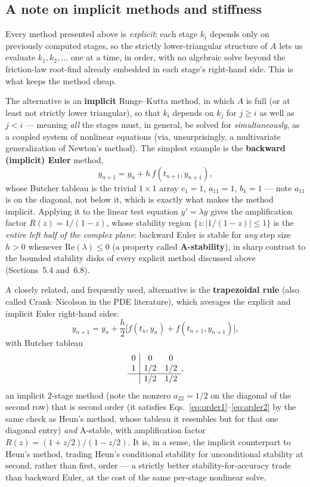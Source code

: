 \subsection{A note on implicit methods and stiffness}

Every method presented above is \emph{explicit}: each stage $k_i$ depends only on previously computed stages, so the strictly lower-triangular structure of $A$ lets us evaluate $k_1, k_2, \dots$ one at a time, in order, with no algebraic solve beyond the friction-law root-find already embedded in each stage's right-hand side. This is what keeps the method cheap.

The alternative is an \textbf{implicit} Runge--Kutta method, in which $A$ is full (or at least not strictly lower triangular), so that $k_i$ depends on $k_j$ for $j \ge i$ as well as $j<i$ --- meaning \emph{all} the stages must, in general, be solved for \emph{simultaneously}, as a coupled system of nonlinear equations (via, unsurprisingly, a multivariate generalization of Newton's method). The simplest example is the \textbf{backward (implicit) Euler} method,
\begin{equation}
y_{n+1} = y_n + h\,f(t_{n+1}, y_{n+1}),
\end{equation}
whose Butcher tableau is the trivial $1\times1$ array $c_1=1$, $a_{11}=1$, $b_1=1$ --- note $a_{11}$ is on the diagonal, not below it, which is exactly what makes the method implicit. Applying it to the linear test equation $y'=\lambda y$ gives the amplification factor $R(z) = 1/(1-z)$, whose stability region $\{z : |1/(1-z)|\le 1\}$ is the \emph{entire left half of the complex plane}: backward Euler is stable for \emph{any} step size $h>0$ whenever $\mathrm{Re}(\lambda)\le 0$ (a property called \textbf{A-stability}), in sharp contrast to the bounded stability disks of every explicit method discussed above (Sections~5.4 and~6.8).

A closely related, and frequently used, alternative is the \textbf{trapezoidal rule} (also called Crank--Nicolson in the PDE literature), which averages the explicit and implicit Euler right-hand sides:
\begin{equation}
y_{n+1} = y_n + \frac{h}{2}\Big[f(t_n,y_n) + f(t_{n+1}, y_{n+1})\Big],
\end{equation}
with Butcher tableau
\begin{equation}
\begin{array}{c|cc}
0 & 0 & 0\\
1 & 1/2 & 1/2 \\ \hline
 & 1/2 & 1/2
\end{array},
\end{equation}
an implicit 2-stage method (note the nonzero $a_{22}=1/2$ on the diagonal of the second row) that is second order (it satisfies Eqs.~\eqref{eq:order1}--\eqref{eq:order2} by the same check as Heun's method, whose tableau it resembles but for that one diagonal entry) \emph{and} A-stable, with amplification factor $R(z) = (1+z/2)/(1-z/2)$. It is, in a sense, the implicit counterpart to Heun's method, trading Heun's conditional stability for unconditional stability at second, rather than first, order --- a strictly better stability-for-accuracy trade than backward Euler, at the cost of the same per-stage nonlinear solve.

